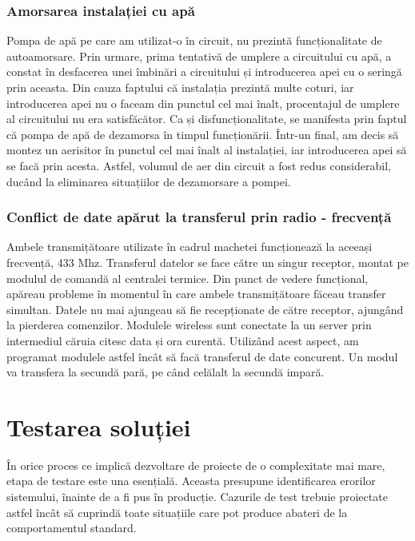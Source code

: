 \subsubsection{Amorsarea instalației cu apă}

	Pompa de apă pe care am utilizat-o în circuit, nu prezintă funcționalitate de autoamorsare. Prin urmare, prima tentativă de umplere a circuitului cu apă, a constat în desfacerea unei îmbinări a circuitului și introducerea apei cu o seringă prin aceasta. Din cauza faptului că instalația prezintă multe coturi, iar introducerea apei nu o faceam din punctul cel mai înalt, procentajul de umplere al circuitului nu era satisfăcător. Ca și disfuncționalitate, se manifesta prin faptul că pompa de apă de dezamorsa în timpul funcționării. Într-un final, am decis să montez un aerisitor în punctul cel mai înalt al instalației, iar introducerea apei să se facă prin acesta. Astfel, volumul de aer din circuit a fost redus considerabil, ducând la eliminarea situațiilor de dezamorsare a pompei.

\subsubsection{Conflict de date apărut la transferul prin radio - frecvență}

	Ambele transmițătoare utilizate în cadrul machetei funcționează la aceeași frecvență, 433 Mhz. Transferul datelor se face către un singur receptor, montat pe modulul de comandă al centralei termice. Din punct de vedere funcțional, apăreau probleme în momentul în care ambele transmițătoare făceau transfer simultan. Datele nu mai ajungeau să fie recepționate de către receptor, ajungând la pierderea comenzilor. Modulele wireless sunt conectate la un server prin intermediul căruia citesc data și ora curentă. Utilizând acest aspect, am programat modulele astfel încât să facă transferul de date concurent. Un modul va transfera la secundă pară, pe când celălalt la secundă impară. 

\section{Testarea soluției}

	În orice proces ce implică dezvoltare de proiecte de o complexitate mai mare, etapa de testare este una esențială. Aceasta presupune identificarea erorilor sistemului, înainte de a fi pus în producție. Cazurile de test trebuie proiectate astfel încât să cuprindă toate situațiile care pot produce abateri de la comportamentul standard. 

